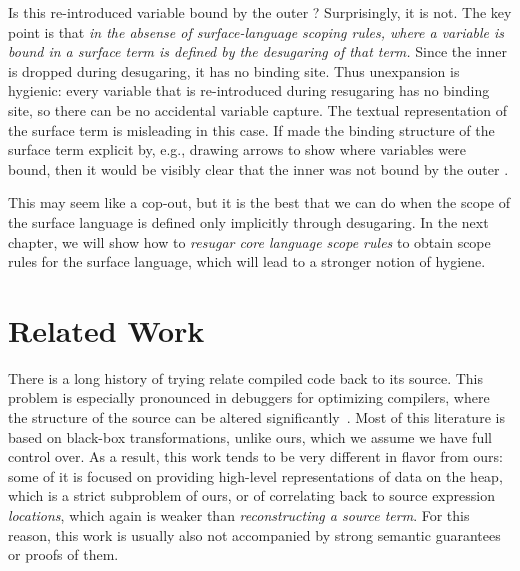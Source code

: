 Is this re-introduced variable bound by the outer ?
Surprisingly, it is not. The key point is that \emph{in the absense of
  surface-language scoping rules, where a variable is bound in a
  surface term is defined by the desugaring of that term.}
Since the inner  is dropped during desugaring, it has no
binding site. Thus unexpansion is hygienic: every variable that is
re-introduced during resugaring has no binding site, so there can be
no accidental variable capture. The textual representation of the
surface term is misleading in this case. If {\Resugarer} made the
binding structure of the surface term explicit by, e.g., drawing
arrows to show where variables were bound, then it would be visibly
clear that the inner  was not bound by the outer .

This may seem like a cop-out, but it is the best that we can do when
the scope of the surface language is defined only implicitly through
desugaring. In the next chapter, we will show how to \emph{resugar
  core language scope rules} to obtain scope rules for the surface
language, which will lead to a stronger notion of hygiene.


\section{Related Work}

There is a long history of trying relate compiled code back to its
source. This problem is especially pronounced in debuggers for
optimizing compilers, where the structure of the source can be altered
significantly~\cite{hennessy-debugging}. Most of this literature
is based on black-box
transformations, unlike ours, which we assume we have full control
over.  As a result, this work tends to be very different in flavor
from ours: some of it is focused on providing high-level
representations of data on the heap, which is a strict subproblem of
ours, or of correlating back to source expression \emph{locations}, which
again is weaker than \emph{reconstructing a source term}.
For this reason,
this work is usually also not accompanied by strong semantic
guarantees or proofs of them.


